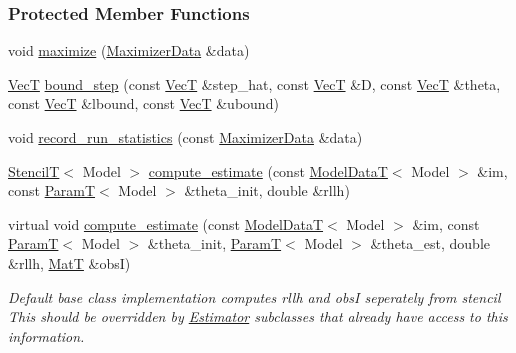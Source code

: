 \subsubsection*{Protected Member Functions}
\begin{DoxyCompactItemize}
\item 
void \hyperlink{classmappel_1_1TrustRegionMaximizer_ae4f4499f81a4d3213e7ea863243e926c}{maximize} (\hyperlink{classmappel_1_1TrustRegionMaximizer_a985b65b01842afcba340901554efa409}{Maximizer\+Data} \&data)
\item 
\hyperlink{namespacemappel_a2225ad69f358daa3f4f99282a35b9a3a}{VecT} \hyperlink{classmappel_1_1TrustRegionMaximizer_a5e21322ad68c50decd2b903251b6eb55}{bound\+\_\+step} (const \hyperlink{namespacemappel_a2225ad69f358daa3f4f99282a35b9a3a}{VecT} \&step\+\_\+hat, const \hyperlink{namespacemappel_a2225ad69f358daa3f4f99282a35b9a3a}{VecT} \&D, const \hyperlink{namespacemappel_a2225ad69f358daa3f4f99282a35b9a3a}{VecT} \&theta, const \hyperlink{namespacemappel_a2225ad69f358daa3f4f99282a35b9a3a}{VecT} \&lbound, const \hyperlink{namespacemappel_a2225ad69f358daa3f4f99282a35b9a3a}{VecT} \&ubound)
\item 
void \hyperlink{classmappel_1_1IterativeMaximizer_af5614c292f139b5032b733a8d6fdf73e}{record\+\_\+run\+\_\+statistics} (const \hyperlink{classmappel_1_1TrustRegionMaximizer_a985b65b01842afcba340901554efa409}{Maximizer\+Data} \&data)
\item 
\hyperlink{namespacemappel_a3a06598240007876f8c4bf834ad86197}{StencilT}$<$ Model $>$ \hyperlink{classmappel_1_1IterativeMaximizer_ad83f7b0a5b4d412f419b6089e73a66e0}{compute\+\_\+estimate} (const \hyperlink{namespacemappel_a97f050df953605381ae9c901c3b125f1}{Model\+DataT}$<$ Model $>$ \&im, const \hyperlink{namespacemappel_a667925cb0d6c0e49f2f035cc5a9a6857}{ParamT}$<$ Model $>$ \&theta\+\_\+init, double \&rllh)
\item 
virtual void \hyperlink{classmappel_1_1Estimator_aa46d86cfb5c336c9cb8c106da036d7d1}{compute\+\_\+estimate} (const \hyperlink{namespacemappel_a97f050df953605381ae9c901c3b125f1}{Model\+DataT}$<$ Model $>$ \&im, const \hyperlink{namespacemappel_a667925cb0d6c0e49f2f035cc5a9a6857}{ParamT}$<$ Model $>$ \&theta\+\_\+init, \hyperlink{namespacemappel_a667925cb0d6c0e49f2f035cc5a9a6857}{ParamT}$<$ Model $>$ \&theta\+\_\+est, double \&rllh, \hyperlink{namespacemappel_a7091ab87c528041f7e2027195fad8915}{MatT} \&obsI)
\begin{DoxyCompactList}\small\item\em Default base class implementation computes rllh and obsI seperately from stencil This should be overridden by \hyperlink{classmappel_1_1Estimator}{Estimator} subclasses that already have access to this information. \end{DoxyCompactList}\item 

\end{DoxyCompactItemize}
